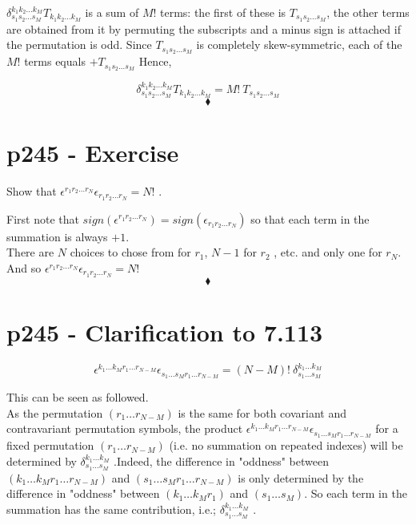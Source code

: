 $\delta^{k_1k_2\dots k_M}_{s_1s_2\dots s_M}T_{k_1k_2\dots k_M}$ is a sum of $M!$ terms: the first of these is $T_{s_1s_2\dots s_M}$, the other terms are obtained from it by permuting the subscripts and a minus sign is attached if the permutation is odd. Since $T_{s_1s_2\dots s_M}$ is completely skew-symmetric, each of the $M!$ terms equals  $+T_{s_1s_2\dots s_M}$ 
Hence,

$$ \delta^{k_1k_2\dots k_M}_{s_1s_2\dots s_M}T_{k_1k_2\dots k_M}= M! \ T_{s_1s_2\dots s_M}$$
$$\blacklozenge$$
\newpage



\section{p245 - Exercise}
\begin{tcolorbox}
Show that $\epsilon^{r_1r_2\dots r_N}\epsilon_{r_1r_2\dots r_N}= N!$ .
\end{tcolorbox}
First note that $sign(\epsilon^{r_1r_2\dots r_N})=sign(\epsilon_{r_1r_2\dots r_N})$ so that each term in the summation is always $+1$.\\
There are $N$ choices to chose from for $r_1$, $N-1$ for $r_2$ , etc. and only one for $r_N$. And so $\epsilon^{r_1r_2\dots r_N}\epsilon_{r_1r_2\dots r_N}= N!$ 
$$\blacklozenge$$
\newpage




\section{p245 - Clarification to 7.113 }
\begin{tcolorbox}
$$\epsilon^{k_1\dots k_M r_1\dots r_{N-M}}\epsilon_{s_1\dots s_M r_1\dots r_{N-M}}= \left(N-M\right)!\ \delta^{k_1\dots k_M}_{s_1\dots s_M}$$
\end{tcolorbox}
This can be seen as followed.\\
As the permutation $\left(r_1\dots r_{N-M}\right) $ is the same for both covariant and contravariant permutation symbols, the product $\epsilon^{k_1\dots k_M r_1\dots r_{N-M}}\epsilon_{s_1\dots s_M r_1\dots r_{N-M}}$ for a fixed permutation $\left(r_1\dots r_{N-M}\right) $ (i.e. no summation on repeated indexes) will be determined by $\delta^{k_1\dots k_M}_{s_1\dots s_M} $ .Indeed,  the difference in "oddness" between  $(k_1\dots k_M r_1\dots r_{N-M})$ and $(s_1\dots s_M r_1\dots r_{N-M})$  is only determined by the difference in "oddness" between  $(k_1\dots k_M r_1)$ and $(s_1\dots s_M )$. So each term in the summation has the same contribution, i.e.; $\delta^{k_1\dots k_M}_{s_1\dots s_M} $ .

